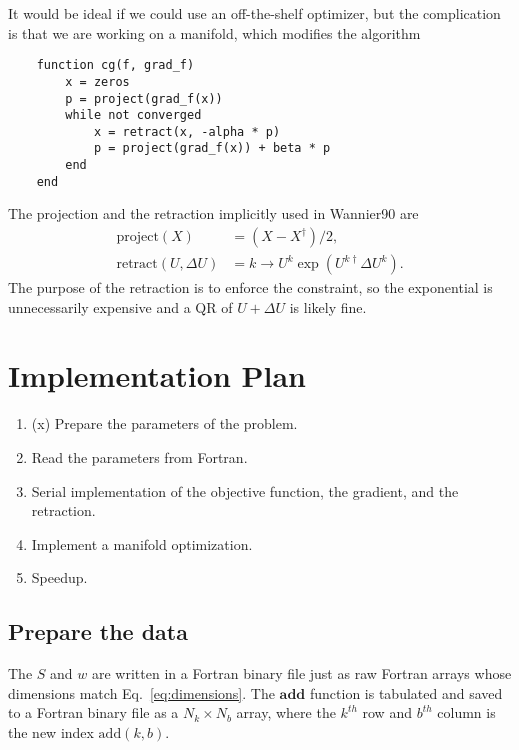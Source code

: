 \documentclass[a4paper, 12pt]{article}
\begin{document}
It would be ideal if we could use an off-the-shelf optimizer, but the complication is 
that we are working on a manifold, which modifies the algorithm
\vspace{-0.5cm}
\begin{verbatim}
    function cg(f, grad_f)
        x = zeros
        p = project(grad_f(x))
        while not converged
            x = retract(x, -alpha * p)
            p = project(grad_f(x)) + beta * p
        end
    end
\end{verbatim}
\vspace{-0.5cm}
The projection and the retraction implicitly used in Wannier90 are
\begin{align}
    \mathrm{project}(X) &= (X - X^{\dagger}) / 2,\\
    \mathrm{retract}(U, \Delta U) &= k \to U^k \exp(U^{k \dagger} \Delta U^k).
\end{align}
The purpose of the retraction is to enforce the constraint, so the exponential
is unnecessarily expensive  and a QR of $U + \Delta U$ is likely fine.

\section{Implementation Plan}%
\label{sec:Implementation Plan}

\begin{enumerate}
    \item (x) Prepare the parameters of the problem.
    \item Read the parameters from Fortran.
    \item Serial implementation of the objective function, the gradient, and
        the retraction.
    \item Implement a manifold optimization.
    \item Speedup.
\end{enumerate}

\subsection{Prepare the data}%
\label{sub:Prepare the data}

The $S$ and $w$ are written in a Fortran binary file just as raw Fortran arrays
whose dimensions match Eq.~\ref{eq:dimensions}. The $\mathbf{add}$ function is 
tabulated and saved to a Fortran binary file as a $N_k \times N_b$ array, 
where the $k^{th}$ row and $b^{th}$ column is the new index $\mathrm{add}(k, b)$.
\end{document}
